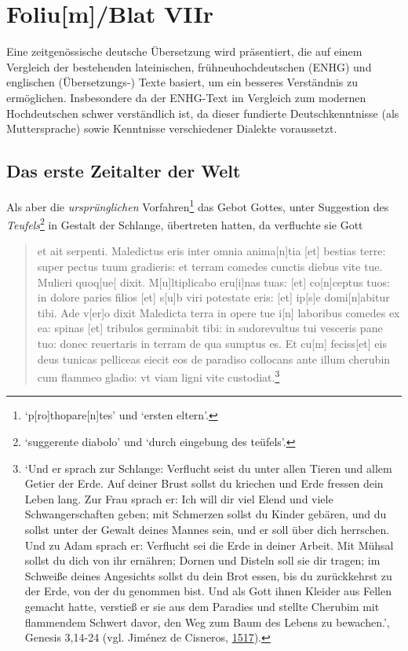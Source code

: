 \documentclass[
]{article}
\author{Dietmar Gerald Schrausser}
\date{09.05.2026}
\begin{document}
\hypertarget{foliumblat-viir}{%
\section{Foliu{[}m{]}/Blat VIIr}\label{foliumblat-viir}}

Eine zeitgenössische deutsche Übersetzung wird präsentiert, die auf
einem Vergleich der bestehenden lateinischen, frühneuhochdeutschen
(ENHG) und englischen (Übersetzungs-) Texte basiert, um ein besseres
Verständnis zu ermöglichen. Insbesondere da der ENHG-Text im Vergleich
zum modernen Hochdeutschen schwer verständlich ist, da dieser fundierte
Deutschkenntnisse (als Muttersprache) sowie Kenntnisse verschiedener
Dialekte voraussetzt.

\hypertarget{das-erste-zeitalter-der-welt}{%
\subsection{Das erste Zeitalter der
Welt}\label{das-erste-zeitalter-der-welt}}

Als aber die \emph{ursprünglichen} Vorfahren\footnote{`p{[}ro{]}thopare{[}n{]}tes'
  und `ersten eltern'.} das Gebot Gottes, unter Suggestion des
\emph{Teufels}\footnote{`suggerente diabolo' und `durch eingebung des
  teüfels'.} in Gestalt der Schlange, übertreten hatten, da verfluchte
sie Gott

\begin{quote}
et ait serpenti. Maledictus eris inter omnia anima{[}n{]}tia {[}et{]}
bestias terre: super pectus tuum gradieris: et terram comedes cunctis
diebus vite tue. Mulieri quoq{[}ue{[} dixit. M{[}u{]}ltiplicabo
eru{[}i{]}nas tuas: {[}et{]} co{[}n{]}ceptus tuos: in dolore paries
filios {[}et{]} s{[}u{]}b viri potestate eris: {[}et{]} ip{[}s{]}e
domi{[}n{]}abitur tibi. Ade v{[}er{]}o dixit Maledicta terra in opere
tue i{[}n{]} laboribus comedes ex ea: spinas {[}et{]} tribulos
germinabit tibi: in sudorevultus tui vesceris pane tuo: donec reuertaris
in terram de qua sumptus es. Et cu{[}m{]} feciss{[}et{]} eis deus
tunicas pelliceas eiecit eos de paradiso collocans ante illum cherubin
cum flammeo gladio: vt viam ligni vite custodiat.\footnote{`Und er
  sprach zur Schlange: Verflucht seist du unter allen Tieren und allem
  Getier der Erde. Auf deiner Brust sollst du kriechen und Erde fressen
  dein Leben lang. Zur Frau sprach er: Ich will dir viel Elend und viele
  Schwangerschaften geben; mit Schmerzen sollst du Kinder gebären, und
  du sollst unter der Gewalt deines Mannes sein, und er soll über dich
  herrschen. Und zu Adam sprach er: Verflucht sei die Erde in deiner
  Arbeit. Mit Mühsal sollst du dich von ihr ernähren; Dornen und Disteln
  soll sie dir tragen; im Schweiße deines Angesichts sollst du dein Brot
  essen, bis du zurückkehrst zu der Erde, von der du genommen bist. Und
  als Gott ihnen Kleider aus Fellen gemacht hatte, verstieß er sie aus
  dem Paradies und stellte Cherubim mit flammendem Schwert davor, den
  Weg zum Baum des Lebens zu bewachen.', Genesis 3,14-24 (vgl. Jiménez
  de Cisneros, \href{https://doi.org/10.3931/e-rara-46695}{1517}).}
\end{quote}
\end{document}
